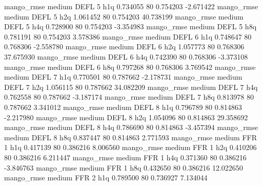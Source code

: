        mango_rmse     medium     DEFL                 5                  h1q  0.734055 80       0.754203          -2.671422
       mango_rmse     medium     DEFL                 5                  h2q  1.061452 80       0.754203          40.738199
       mango_rmse     medium     DEFL                 5                  h4q  0.728900 80       0.754203          -3.354983
       mango_rmse     medium     DEFL                 5                  h8q  0.781191 80       0.754203           3.578386
       mango_rmse     medium     DEFL                 6                  h1q  0.748647 80       0.768306          -2.558780
       mango_rmse     medium     DEFL                 6                  h2q  1.057773 80       0.768306          37.675930
       mango_rmse     medium     DEFL                 6                  h4q  0.742390 80       0.768306          -3.373108
       mango_rmse     medium     DEFL                 6                  h8q  0.797268 80       0.768306           3.769542
       mango_rmse     medium     DEFL                 7                  h1q  0.770501 80       0.787662          -2.178731
       mango_rmse     medium     DEFL                 7                  h2q  1.056115 80       0.787662          34.082209
       mango_rmse     medium     DEFL                 7                  h4q  0.762558 80       0.787662          -3.187174
       mango_rmse     medium     DEFL                 7                  h8q  0.813978 80       0.787662           3.341012
       mango_rmse     medium     DEFL                 8                  h1q  0.796789 80       0.814863          -2.217980
       mango_rmse     medium     DEFL                 8                  h2q  1.054096 80       0.814863          29.358692
       mango_rmse     medium     DEFL                 8                  h4q  0.786690 80       0.814863          -3.457394
       mango_rmse     medium     DEFL                 8                  h8q  0.837447 80       0.814863           2.771593
       mango_rmse     medium      FFR                 1                  h1q  0.417139 80       0.386216           8.006560
       mango_rmse     medium      FFR                 1                  h2q  0.410206 80       0.386216           6.211447
       mango_rmse     medium      FFR                 1                  h4q  0.371360 80       0.386216          -3.846763
       mango_rmse     medium      FFR                 1                  h8q  0.432650 80       0.386216          12.022650
       mango_rmse     medium      FFR                 2                  h1q  0.789500 80       0.736927           7.134044
